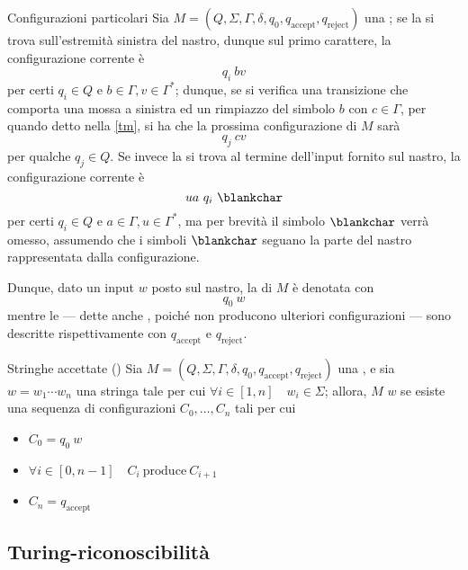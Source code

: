 \documentclass[a4paper, 12pt]{report}
\begin{document}
    \begin{framedobs}{Configurazioni particolari}
        Sia $M = (Q, \Sigma, \Gamma, \delta, q_0, q_\mathrm{accept}, q_\mathrm{reject})$ una \TM; se la \TM si trova sull'estremità sinistra del nastro, dunque sul primo carattere, la configurazione corrente è $$q_i \ bv$$ per certi $q_i \in Q$ e $b \in \Gamma, v \in \Gamma^*$; dunque, se si verifica una transizione che comporta una mossa a sinistra ed un rimpiazzo del simbolo $b$ con $c \in \Gamma$, per quando detto nella \cref{tm}, si ha che la prossima configurazione di $M$ sarà $$q_j \ cv$$ per qualche $q_j \in Q$. Se invece la \TM si trova al termine dell'input fornito sul nastro, la configurazione corrente è $$ua \ q_i \ \blankchar$$ per certi $q_i \in Q$ e $a \in \Gamma, u \in \Gamma^*$, ma per brevità il simbolo $\blankchar$ verrà omesso, assumendo che i simboli $\blankchar$ seguano la parte del nastro rappresentata dalla configurazione.

        Dunque, dato un input $w$ posto sul nastro, la  di $M$ è denotata con $$q_0 \ w$$ mentre le  --- dette anche , poiché non producono ulteriori configurazioni --- sono descritte rispettivamente con $q_\mathrm{accept}$ e $q_\mathrm{reject}$.
    \end{framedobs}

    \begin{frameddefn}{Stringhe accettate (\TM)}
        Sia $M = (Q, \Sigma, \Gamma, \delta, q_0, q_\mathrm{accept}, q_\mathrm{reject})$ una \TM, e sia $w = w_1 \cdots w_n$ una stringa tale per cui $\forall i \in [1, n] \quad w_i \in \Sigma$; allora, $M$  $w$ se esiste una sequenza di configurazioni $C_0, \ldots, C_n$ tali per cui

        \begin{itemize}
            \item $C_0 = q_0 \ w$
            \item $\forall i \in [0, n - 1] \quad C_i \ \mathrm{produce} \ C_{i + 1}$
            \item $C_n = q_\mathrm{accept}$
        \end{itemize}
    \end{frameddefn}

    \subsection{Turing-riconoscibilità}
\end{document}
